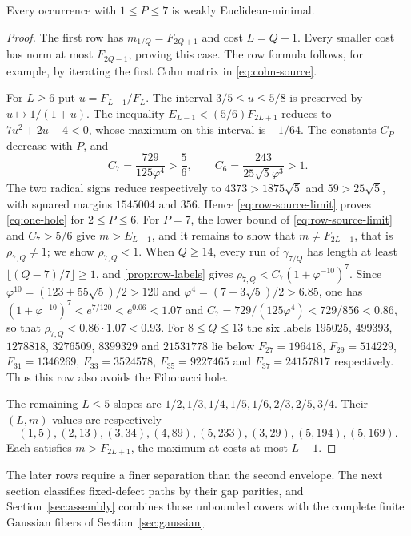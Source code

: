 \begin{proposition}\label{prop:rows-seven}
Every occurrence with $1\leqslant P\leqslant7$ is weakly
Euclidean-minimal.
\end{proposition}

\begin{proof}
The first row has $m_{1/Q}=F_{2Q+1}$ and cost $L=Q-1$.
Every smaller cost has norm at most $F_{2Q-1}$, proving this case.
The row formula follows, for example, by iterating the first Cohn
matrix in \eqref{eq:cohn-source}.

For $L\geqslant6$ put $u=F_{L-1}/F_L$. The interval
$3/5\leqslant u\leqslant5/8$ is preserved by $u\mapsto1/(1+u)$.
The inequality $E_{L-1}<(5/6)F_{2L+1}$ reduces to
$7u^2+2u-4<0$, whose maximum on this interval is $-1/64$.
The constants $C_P$ decrease with $P$, and
$$
 C_7=\frac{729}{125\varphi^4}>\frac56,\qquad
 C_6=\frac{243}{25\sqrt5\varphi^3}>1.
$$
The two radical signs reduce respectively to
$4373>1875\sqrt5$ and $59>25\sqrt5$, with squared margins
$1545004$ and $356$. Hence
\eqref{eq:row-source-limit} proves \eqref{eq:one-hole} for
$2\leqslant P\leqslant6$. For $P=7$, the lower bound of
\eqref{eq:row-source-limit} and $C_7>5/6$ give $m>E_{L-1}$, and it remains to
show that $m\neq F_{2L+1}$, that is $\rho_{7,Q}\neq1$; we show $\rho_{7,Q}<1$. When
$Q\geqslant14$, every run of $\gamma_{7/Q}$ has length at least
$\lfloor(Q-7)/7\rfloor\geqslant1$, and \cref{prop:row-labels} gives
$\rho_{7,Q}<C_7(1+\varphi^{-10})^7$. Since $\varphi^{10}=(123+55\sqrt5)/2>120$ and
$\varphi^4=(7+3\sqrt5)/2>6.85$, one has
$(1+\varphi^{-10})^7<e^{7/120}<e^{0.06}<1.07$ and
$C_7=729/(125\varphi^4)<729/856<0.86$, so that $\rho_{7,Q}<0.86\cdot1.07<0.93$.
For $8\leqslant Q\leqslant13$ the six labels
$195025$, $499393$, $1278818$, $3276509$, $8399329$ and $21531778$ lie below
$F_{27}=196418$, $F_{29}=514229$, $F_{31}=1346269$, $F_{33}=3524578$,
$F_{35}=9227465$ and $F_{37}=24157817$ respectively.
Thus this row also avoids the Fibonacci hole.

The remaining $L\leqslant5$ slopes are
$1/2,1/3,1/4,1/5,1/6,2/3,2/5,3/4$.
Their $(L,m)$ values are respectively
$$
 (1,5),(2,13),(3,34),(4,89),(5,233),(3,29),(5,194),(5,169).
$$
Each satisfies $m>F_{2L+1}$, the maximum at costs at most $L-1$.
\end{proof}

The later rows require a finer separation than the second envelope.
The next section classifies fixed-defect paths by their gap parities, and
Section~\ref{sec:assembly} combines those unbounded covers with the
complete finite Gaussian fibers of Section~\ref{sec:gaussian}.
